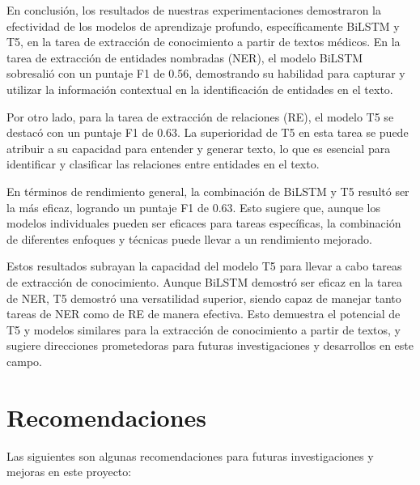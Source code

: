 \documentclass[10pt]{article} %
\begin{document}
	En conclusión, los resultados de nuestras experimentaciones demostraron la efectividad de los modelos de aprendizaje profundo, específicamente BiLSTM y T5, en la tarea de extracción de conocimiento a partir de textos médicos. En la tarea de extracción de entidades nombradas (NER), el modelo BiLSTM sobresalió con un puntaje F1 de 0.56, demostrando su habilidad para capturar y utilizar la información contextual en la identificación de entidades en el texto.
	
	Por otro lado, para la tarea de extracción de relaciones (RE), el modelo T5 se destacó con un puntaje F1 de 0.63. La superioridad de T5 en esta tarea se puede atribuir a su capacidad para entender y generar texto, lo que es esencial para identificar y clasificar las relaciones entre entidades en el texto.
	
	En términos de rendimiento general, la combinación de BiLSTM y T5 resultó ser la más eficaz, logrando un puntaje F1 de 0.63. Esto sugiere que, aunque los modelos individuales pueden ser eficaces para tareas específicas, la combinación de diferentes enfoques y técnicas puede llevar a un rendimiento mejorado.
	
	Estos resultados subrayan la capacidad del modelo T5 para llevar a cabo tareas de extracción de conocimiento. Aunque BiLSTM demostró ser eficaz en la tarea de NER, T5 demostró una versatilidad superior, siendo capaz de manejar tanto tareas de NER como de RE de manera efectiva. Esto demuestra el potencial de T5 y modelos similares para la extracción de conocimiento a partir de textos, y sugiere direcciones prometedoras para futuras investigaciones y desarrollos en este campo.
	
	\section{Recomendaciones}
	
	Las siguientes son algunas recomendaciones para futuras investigaciones y mejoras en este proyecto:
	
\end{document}

